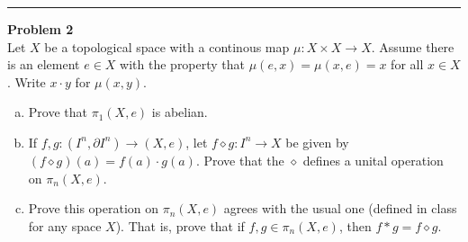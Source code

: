\documentclass[a4paper, 12pt]{article}
\newenvironment{problem}[2][Problem]
    { \begin{mdframed}[backgroundcolor=gray!20] \textbf{#1 #2} \\}
    {  \end{mdframed}}
\begin{document}
\noindent\rule{7in}{2.8pt}
\begin{problem}{2}
Let \(X\) be a topological space with a continous map \(\mu:X\times X\rightarrow X\). Assume there is an element \(e\in X\) with the property that \(\mu(e,x)=\mu(x,e)=x\) for all 
\(x\in X\). Write \(x\cdot y\) for \(\mu(x,y)\).
\begin{enumerate}[(a)]
\item Prove that \(\pi_1(X,e)\) is abelian.
\item If \(f,g:(I^n,\partial I^n)\rightarrow (X,e)\), let \(f\diamond g:I^n\rightarrow X\) be given by \((f\diamond g)(a)=f(a)\cdot g(a)\). Prove that the \(\diamond\) defines a unital operation on \(\pi_n(X,e)\).
\item Prove this operation on \(\pi_n(X,e)\) agrees with the usual one (defined in class for any space \(X\)). That is, prove that if \(f,g\in \pi_n(X,e)\), then \(f*g=f\diamond g\). 
\end{enumerate}
\end{problem}
\end{document}
